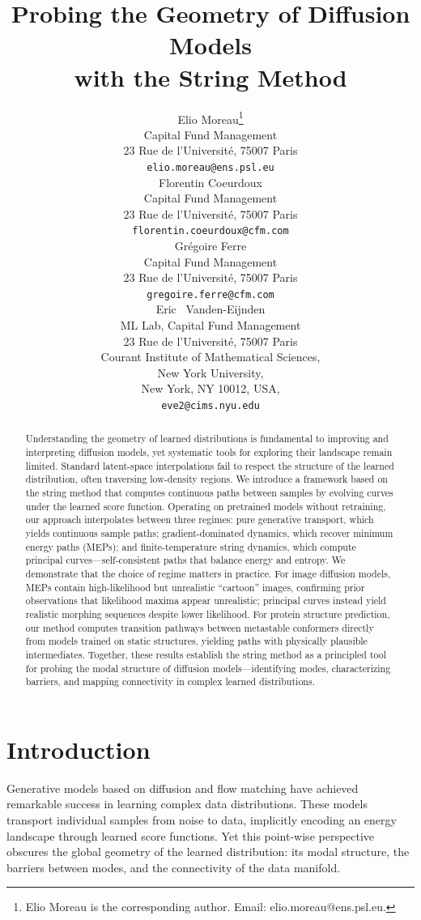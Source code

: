 \documentclass{article}
\title{Probing the Geometry of Diffusion Models\\ with the String Method}
\author{{\hspace{-2mm}Elio Moreau}\thanks{Elio Moreau is the corresponding author. Email: elio.moreau@ens.psl.eu.} \\
	\hspace{-1mm}Capital Fund Management \\
 \hspace{-1mm} 23 Rue de l'Université, 75007 Paris \\
	\texttt{elio.moreau@ens.psl.eu} \\
	\And
	{Florentin Coeurdoux} \\
	Capital Fund Management \\
  23 Rue de l'Université, 75007 Paris \\
	\texttt{florentin.coeurdoux@cfm.com} \\
    \AND
    {\hspace{1mm}Grégoire Ferre} \\
	Capital Fund Management \\
  23 Rue de l'Université, 75007 Paris \\
	\texttt{gregoire.ferre@cfm.com} \\
    \And
    {\hspace{1mm}Eric ~Vanden-Eijnden} \\
    ML Lab, Capital Fund Management \\
  23 Rue de l'Université, 75007 Paris \\
  Courant Institute of Mathematical Sciences, \\
  New York University,\\
  New York, NY 10012, USA,\\
	\texttt{eve2@cims.nyu.edu} \\
}
\theoremstyle{plain}
\theoremstyle{definition}
\theoremstyle{remark}
\begin{document}
\maketitle

\begin{abstract}
Understanding the geometry of learned distributions is fundamental to improving and interpreting diffusion models, yet systematic tools for exploring their landscape remain limited. Standard latent-space interpolations fail to respect the structure of the learned distribution, often traversing low-density regions. We introduce a framework based on the string method that computes continuous paths between samples by evolving curves under the learned score function. Operating on pretrained models without retraining, our approach interpolates between three regimes: pure generative transport, which yields continuous sample paths; gradient-dominated dynamics, which recover minimum energy paths (MEPs); and finite-temperature string dynamics, which compute principal curves---self-consistent paths that balance energy and entropy. We demonstrate that the choice of regime matters in practice. For image diffusion models, MEPs contain high-likelihood but unrealistic ``cartoon'' images, confirming prior observations that likelihood maxima appear unrealistic; principal curves instead yield realistic morphing sequences despite lower likelihood. For protein structure prediction, our method computes transition pathways between metastable conformers directly from models trained on static structures, yielding paths with physically plausible intermediates. Together, these results establish the string method as a principled tool for probing the modal structure of diffusion models---identifying modes, characterizing barriers, and mapping connectivity in complex learned distributions.
\end{abstract}

\section{Introduction}

Generative models based on diffusion and flow matching have achieved remarkable success in learning complex data distributions. These models transport individual samples from noise to data, implicitly encoding an energy landscape through learned score functions. Yet this point-wise perspective obscures the global geometry of the learned distribution: its modal structure, the barriers between modes, and the connectivity of the data manifold.
\end{document}
